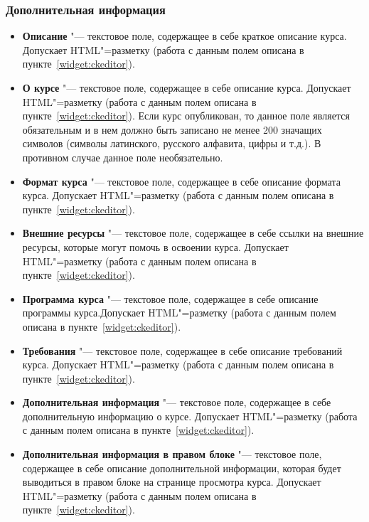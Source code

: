 \subsubsection{Дополнительная информация}
	\begin{itemize}
		\item \textbf{Описание} "--- текстовое поле, содержащее в себе краткое описание курса. Допускает HTML"=разметку (работа с данным полем описана в пункте~\ref{widget:ckeditor}).
		\item \textbf{О курсе} "--- текстовое поле, содержащее в себе описание курса.  Допускает HTML"=разметку (работа с данным полем описана в пункте~\ref{widget:ckeditor}). Если курс опубликован, то данное поле является обязательным и в нем должно быть записано не менее 200 значащих символов (символы латинского, русского алфавита, цифры и т.д.). В противном случае данное поле необязательно.
		\item \textbf{Формат курса} "--- текстовое поле, содержащее в себе описание формата курса. Допускает HTML"=разметку (работа с данным полем описана в пункте~\ref{widget:ckeditor}).
		\item \textbf{Внешние ресурсы} "--- текстовое поле, содержащее в себе ссылки на внешние ресурсы, которые могут помочь в освоении курса. Допускает HTML"=разметку (работа с данным полем описана в пункте~\ref{widget:ckeditor}).
		\item \textbf{Программа курса} "--- текстовое поле, содержащее в себе описание программы курса.Допускает HTML"=разметку (работа с данным полем описана в пункте~\ref{widget:ckeditor}).
		\item \textbf{Требования} "--- текстовое поле, содержащее в себе описание требований курса. Допускает HTML"=разметку (работа с данным полем описана в пункте~\ref{widget:ckeditor}).
		\item \textbf{Дополнительная информация} "--- текстовое поле, содержащее в себе дополнительную информацию о курсе. Допускает HTML"=разметку (работа с данным полем описана в пункте~\ref{widget:ckeditor}).
		\item \textbf{Дополнительная информация в правом блоке} "--- текстовое поле, содержащее в себе описание дополнительной информации, которая будет выводиться в правом блоке на странице просмотра курса. Допускает HTML"=разметку (работа с данным полем описана в пункте~\ref{widget:ckeditor}).
	\end{itemize}
